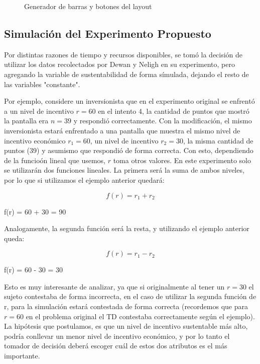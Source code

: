 \documentclass[11pt,letterpaper]{article}
\begin{document}
\begin{figure}
 \centering
 \caption{Generador de barras y botones del layout}
\end{figure}

\subsection{Simulación del Experimento Propuesto}

Por distintas razones de tiempo y recursos disponibles, se tomó la decisión de utilizar los datos recolectados por Dewan y Neligh en su experimento, pero agregando la variable de sustentabilidad de forma símulada, dejando el resto de las variables "constante". 

Por ejemplo, considere un inversionista que en el experimento original se enfrentó a un nivel de incentivo $r = 60$ en el intento 4, la cantidad de puntos que mostró la pantalla era $n=39$ y respondió correctamente.
Con la modificación, el mismo inversionista estará enfrentado a una pantalla que muestra el mismo nivel de incentivo económico $r_1=60$, un nivel de incentivo $r_2=30$, la misma cantidad de puntos (39) y asumismo que respondió de forma correcta. Con esto, dependiendo de la funcioón lineal que usemos, $r$ toma otros valores. 
En este experimento solo se utilizarán dos funciones lineales. La primera será la suma de ambos niveles, por lo que si utilizamos el ejemplo anterior quedará: 

\begin{equation}
    f(r) = r_1 + r_2
\end{equation}
\begin{center}
    f(r) = 60 + 30 = 90
\end{center}


Analogamente, la segunda función será la resta, y utilizando el ejemplo anterior queda:

\begin{equation}
    f(r) = r_1 - r_2
\end{equation}
\begin{center}
    f(r) = 60 - 30 = 30
\end{center}

Esto es muy interesante de analizar, ya que si originalmente al tener un $r = 30$ el sujeto contestaba de forma incorrecta, en el caso de utilizar la segunda función de r, para la simulación estará contestada de forma correcta (recordemos que para $r = 60$ en el problema original el TD contestaba correctamente según el ejemplo). La hipótesis que postulamos, es que un nivel de incentivo sustentable más alto, podría conllevar un menor nivel de incentivo económico, y por lo tanto el tomador de decisión deberá escoger cuál de estos dos atributos es el más importante.
\end{document}
